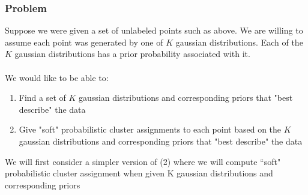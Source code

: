 \documentclass[10pt]{article}
\begin{document}
\subsubsection*{Problem}
Suppose we were given a set of unlabeled points such as above.  We are willing to assume each point was generated by one of $K$ gaussian distributions.  Each of the $K$ gaussian distributions has a prior probability associated with it.\\\\
We would like to be able to:
\begin{enumerate}
    \item Find a set of $K$ gaussian distributions and corresponding priors that "best describe" the data
    \item Give "soft" probabilistic cluster assignments to each point based on the $K$ gaussian distributions and corresponding priors that "best describe" the data
\end{enumerate}
We will first consider a simpler version of (2) where we will compute “soft" probabilistic cluster assignment when given K gaussian distributions and corresponding priors
\end{document}
